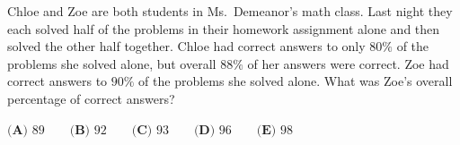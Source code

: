 Chloe and Zoe are both students in Ms.\ Demeanor's math class. Last night they each solved half of the problems in their homework assignment alone and then solved the other half together. Chloe had correct answers to only $80\%$ of the problems she solved alone, but overall $88\%$ of her answers were correct. Zoe had correct answers to $90\%$ of the problems she solved alone. What was Zoe's overall percentage of correct answers?

$\textbf{(A) }89\qquad\textbf{(B) }92\qquad\textbf{(C) }93\qquad\textbf{(D) }96\qquad\textbf{(E) }98$
